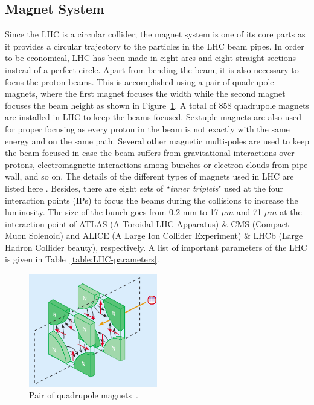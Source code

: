 \subsection{Magnet System}
Since the LHC is a circular collider; the magnet system is one of its core parts as it provides a circular trajectory to the particles in the LHC beam pipes.
In order to be economical, LHC has been made in eight arcs and eight straight sections instead of a perfect circle. Apart from bending the beam, it is also necessary to focus the proton beams. 
This is accomplished using a pair of quadrupole magnets, where the first magnet focuses the width while the second magnet focuses the beam height as shown in Figure~\ref{fig:QuadrupoleMagnet}. 
A total of 858 quadrupole magnets are installed in LHC to keep the beams focused. 
Sextuple magnets are also used for proper focusing as every proton in the beam is not exactly with the same energy and on the same path. 
Several other magnetic multi-poles are used to keep the beam focused  in case the beam suffers from gravitational interactions over protons, electromagnetic interactions among bunches or electron clouds from pipe wall, and so on.
The details of the different types of magnets used in LHC are listed here \cite{WebLink:LHC_magnets}.
Besides, there are eight sets of  ``\textit{inner triplets}" used at the four interaction points (IPs) to focus the beams during the collisions to increase the luminosity. The size of the bunch goes from 0.2 mm to 17 $\mu m$ and 71 $\mu m$ at the interaction point of ATLAS (A Toroidal LHC Apparatus) \& CMS (Compact Muon Solenoid) and ALICE (A Large Ion Collider Experiment) \& LHCb (Large Hadron Collider beauty), respectively. A list of important parameters of the LHC is given in Table~\ref{table:LHC-parameters}.
\begin{figure}[!htbp]
	\centering
	\includegraphics[width=0.50\textwidth]{figures/LHC/quadrupole_magnet_pair.png}
	\caption{Pair of quadrupole magnets~\cite{Vidal}.}
	\label{fig:QuadrupoleMagnet}
\end{figure}



